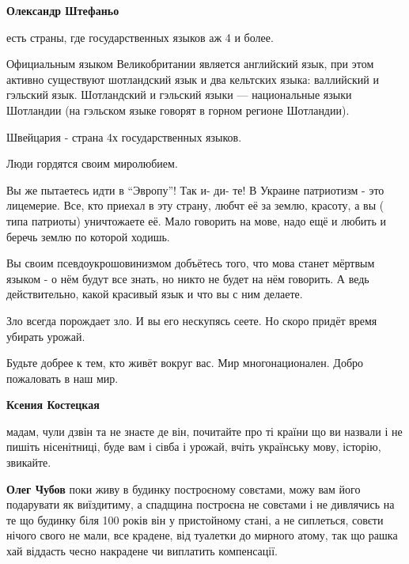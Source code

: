 \begin{itemize}
\begin{itemize}
\textbf{Олександр Штефаньо} 

есть страны, где государственных языков аж 4 и более.

Официальным языком Великобритании является английский язык, при этом активно
существуют шотландский язык и два кельтских языка: валлийский и гэльский язык.
Шотландский и гэльский языки — национальные языки Шотландии (на гэльском языке
говорят в горном регионе Шотландии).

Швейцария - страна 4х государственных языков.

Люди гордятся своим миролюбием.

Вы же пытаетесь идти в \enquote{Эвропу}! Так и- ди- те! В Украине патриотизм - это
лицемерие. Все, кто приехал в эту страну, любчт её за землю, красоту, а вы (
типа патриоты) уничтожаете её. Мало говорить на мове, надо ещё и любить и
беречь землю по которой ходишь.

Вы своим псевдоукрошовинизмом добъётесь того, что мова станет мёртвым языком -
о нём будут все знать, но никто не будет на нём говорить. А ведь действительно,
какой красивый язык и что вы с ним делаете.

Зло всегда порождает зло. И вы его нескупясь сеете. Но скоро придёт время
убирать урожай.

Будьте добрее к тем, кто живёт вокруг вас. Мир многонационален. Добро
пожаловать в наш мир.

\textbf{Ксения Костецкая} 

мадам, чули дзвін та не знаєте де він, почитайте про
ті країни що ви назвали і не пишіть нісенітниці, буде вам і сівба і урожай, вчіть
українську мову, історію, звикайте.


\textbf{Олег Чубов} поки живу в будинку построєному совєтами, можу вам його
подарувати як виїздитиму, а спадщина построєна не совєтами і не дивлячись на те
що будинку біля 100 років він у пристойному стані, а не сиплеться, совєти
нічого свого не мали, все крадене, від туалетки до мирного атому, так що рашка
хай віддасть чесно накрадене чи виплатить компенсації.



\end{itemize}
\end{itemize}

